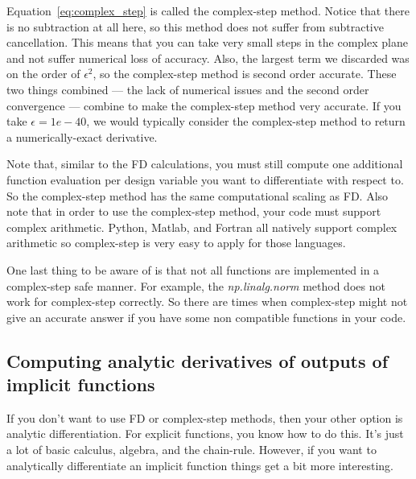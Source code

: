 \documentclass[conf]{new-aiaa}
\begin{document}
    Equation~\eqref{eq:complex_step} is called the complex-step method. 
    Notice that there is no subtraction at all here, so this method does not suffer from subtractive cancellation. 
    This means that you can take very small steps in the complex plane and not suffer numerical loss of accuracy. 
    Also, the largest term we discarded was on the order of $\epsilon^2$, so the complex-step method is second order accurate. 
    These two things combined --- the lack of numerical issues and the second order convergence --- combine to make the complex-step method very accurate. 
    If you take $\epsilon=1e-40$, we would typically consider the complex-step method to return a numerically-exact derivative. 

    Note that, similar to the FD calculations, you must still compute one additional function evaluation per design variable you want to differentiate with respect to. 
    So the complex-step method has the same computational scaling as FD. 
    Also note that in order to use the complex-step method, your code must support complex arithmetic. 
    Python, Matlab, and Fortran all natively support complex arithmetic so complex-step is very easy to apply for those languages. 

    One last thing to be aware of is that not all functions are implemented in a complex-step safe manner. 
    For example, the \textit{np.linalg.norm} method does not work for complex-step correctly. 
    So there are times when complex-step might not give an accurate answer if you have some non compatible functions in your code. 




    \subsection{Computing analytic derivatives of outputs of implicit functions}
    \label{subsec:analytic_deriv_implicit_function}

    If you don't want to use FD or complex-step methods, then your other option is analytic differentiation. 
    For explicit functions, you know how to do this.
    It's just a lot of basic calculus, algebra, and the chain-rule. 
    However, if you want to analytically differentiate an implicit function things get a bit more interesting. 
\end{document}
